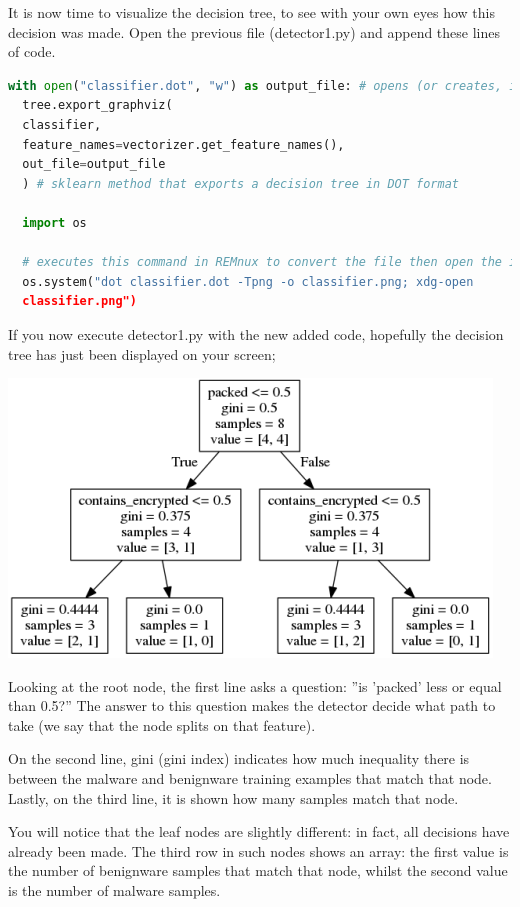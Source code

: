 \documentclass[]{project_plan}
\begin{document}
It is now time to visualize the decision tree, to see with your own eyes how
this decision was made. Open the previous file (detector1.py) and append
these lines of code.

\begin{lstlisting}[language=python]
  with open("classifier.dot", "w") as output_file: # opens (or creates, if it does not exist), the classifier.dot file to Write content in it.
  tree.export_graphviz(
  classifier,
  feature_names=vectorizer.get_feature_names(),
  out_file=output_file
  ) # sklearn method that exports a decision tree in DOT format

  import os

  # executes this command in REMnux to convert the file then open the image
  os.system("dot classifier.dot -Tpng -o classifier.png; xdg-open
  classifier.png")
\end{lstlisting}

If you now execute detector1.py with the new added code, hopefully the
decision tree has just been displayed on your screen;

\includegraphics[width=.7\linewidth]{lab5 decision tree.png}

Looking at the root node, the first line asks a question: ”is ’packed’ less or
equal than 0.5?” The answer to this question makes the detector decide what
path to take (we say that the node splits on that feature).

On the second line,
gini (gini index) indicates how much inequality there is between the malware
and benignware training examples that match that node. Lastly, on the third
line, it is shown how many samples match that node.

You will notice that the leaf nodes are slightly different: in fact, all decisions
have already been made. The third row in such nodes shows an array: the first
value is the number of benignware samples that match that node, whilst the
second value is the number of malware samples.
\end{document}
